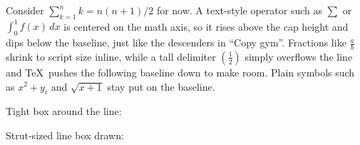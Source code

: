 \documentclass[12pt]{article}
\begin{document}
\noindent
Consider $\sum_{k=1}^n k = n(n+1)/2$ for now. A text-style operator such as
$\sum$ or $\int_0^1 f(x)\,dx$ is centered on the math axis, so it rises above
the cap height and dips below the baseline, just like the descenders in
``Copy gym''. Fractions like $\frac{a}{b}$ shrink to script size inline, while
a tall delimiter $\left(\frac{1}{2}\right)$ simply overflows the line and
\TeX\ pushes the following baseline down to make room. Plain symbols such as
$x^2 + y_i$ and $\sqrt{x+1}$ stay put on the baseline.

\medskip
\noindent
Tight box around the line: 

\medskip
\noindent
Strut-sized line box drawn: 
\end{document}
